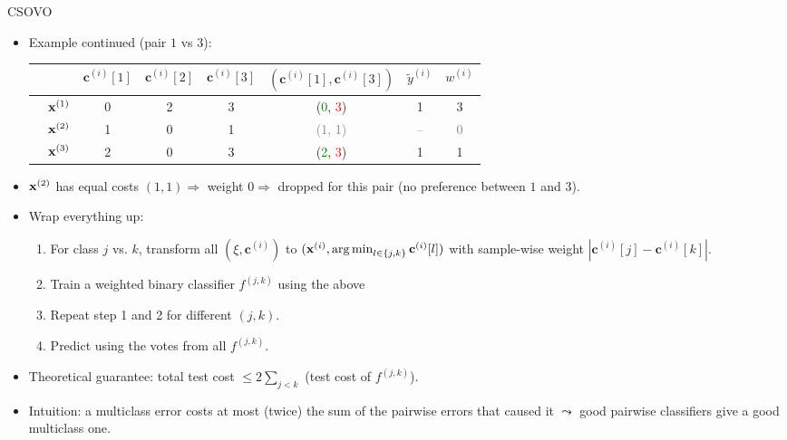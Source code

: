 \documentclass[11pt,compress,t,notes=noshow, xcolor=table]{beamer}
\newcommand{\cv}{\mathbf{c}}
\begin{document}
\begin{frame}{CSOVO}
    \begin{itemize}
    \item Example continued (pair $1$ vs $3$):
    \begin{center}  
        \footnotesize{
            \begin{tabular}{cc|ccc|ccc}
                & & $\cv^{(i)}[1]$ & $\cv^{(i)}[2]$ & $\cv^{(i)}[3]$ & $(\cv^{(i)}[1], \cv^{(i)}[3])$ & $\tilde{y}^{(i)}$ & $w^{(i)}$\\
                \hline & $\mathbf{x}^{(1)}$ & 0 & 2 & 3 & (\textcolor{green}{0}, \textcolor{red}{3}) & 1 & 3\\
                & $\mathbf{x}^{(2)}$ & 1 & 0 & 1 & \textcolor{gray}{(1, 1)} & \textcolor{gray}{--} & \textcolor{gray}{0} \\
                & $\mathbf{x}^{(3)}$ & 2 & 0 & 3 & (\textcolor{green}{2}, \textcolor{red}{3}) & 1 & 1\\
            \end{tabular}
        }
    \end{center}

    \item $\mathbf{x}^{(2)}$ has equal costs $(1, 1) \Rightarrow$ weight $0 \Rightarrow$ dropped for this pair (no preference between $1$ and $3$).

    \item Wrap everything up:
    \begin{enumerate}
        \item For class $j$ vs. $k$, transform all $(\xi, \cv^{(i)})$ to $(\xi, \argmin_{l \in \{j, k\}} \cv^{(i)}[l])$ with sample-wise weight $|\cv^{(i)}[j] - \cv^{(i)}[k]|$.
        
        \item Train a weighted binary classifier $f^{(j, k)}$ using the above
        
        \item Repeat step 1 and 2 for different $(j, k)$.
        
        \item Predict using the votes from all $f^{(j, k)}$.
    \end{enumerate}

    \item Theoretical guarantee: total test cost $\leq 2\sum_{j < k}$ (test cost of $f^{(j, k)}$).
    \item[] {\footnotesize Intuition: a multiclass error costs at most (twice) the sum of the pairwise errors that caused it $\leadsto$ good pairwise classifiers give a good multiclass one.}
    \end{itemize}
\end{frame}
\end{document}
